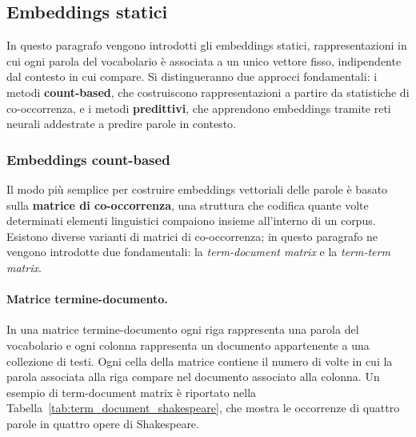 \subsection{Embeddings statici}
\label{sec:static_embeddings}
In questo paragrafo vengono introdotti gli embeddings statici, rappresentazioni in cui ogni parola del vocabolario è associata a un unico vettore fisso, indipendente dal contesto in cui compare. Si distingueranno due approcci fondamentali: i metodi \textbf{count-based}, che costruiscono rappresentazioni a partire da statistiche di co-occorrenza, e i metodi \textbf{predittivi}, che apprendono embeddings tramite reti neurali addestrate a predire parole in contesto.
\subsubsection{Embeddings count-based}
\label{subsubsec:count_based}
Il modo più semplice per costruire embeddings vettoriali delle parole è basato sulla \textbf{matrice di co-occorrenza}, una struttura che codifica quante volte determinati elementi linguistici compaiono insieme all'interno di un corpus. Esistono diverse varianti di matrici di co-occorrenza; in questo paragrafo ne vengono introdotte due fondamentali: la \emph{term-document matrix} e la \emph{term-term matrix}.
\paragraph{Matrice termine-documento.}
In una matrice termine-documento ogni riga rappresenta una parola del vocabolario e ogni colonna rappresenta un documento appartenente a una collezione di testi. Ogni cella della matrice contiene il numero di volte in cui la parola associata alla riga compare nel documento associato alla colonna. Un esempio di term-document matrix è riportato nella Tabella~\ref{tab:term_document_shakespeare}, che mostra le occorrenze di quattro parole in quattro opere di Shakespeare.

